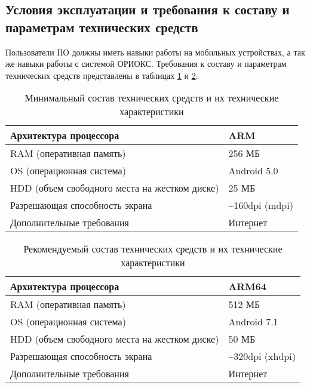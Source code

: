 \documentclass[draft,13sp]{mietuspd}
\begin{document}
\subsection{Условия эксплуатации и требования к составу и параметрам технических средств}
Пользователи ПО должны иметь навыки работы на мобильных устройствах, а так же навыки работы с системой ОРИОКС.
Требования к составу и параметрам технических средств представлены в таблицах \ref{table:rqmts_min} и \ref{table:rqmts_recommended}.

\begin{table}[h]
    \centering
    \begin{tabular}{|l|l|}
        \hline Архитектура процессора & ARM \\ \hline
        RAM (оперативная память) & 256 МБ \\ \hline
        OS (операционная система) & Android 5.0 \\ \hline
        HDD (объем свободного места на жестком диске) & 25 МБ \\ \hline
        Разрешающая способность экрана & \textasciitilde 160dpi (mdpi) \\ \hline
        Дополнительные требования & Интернет \\ \hline
    \end{tabular}
    \caption{Минимальный состав технических средств и их технические характеристики}
    \label{table:rqmts_min}
\end{table}

\begin{table}[h]
    \centering
    \begin{tabular}{|l|l|}
        \hline Архитектура процессора & ARM64 \\ \hline
        RAM (оперативная память) & 512 МБ \\ \hline
        OS (операционная система) & Android 7.1 \\ \hline
        HDD (объем свободного места на жестком диске) & 50 МБ \\ \hline
        Разрешающая способность экрана & \textasciitilde 320dpi (xhdpi) \\ \hline
        Дополнительные требования & Интернет \\ \hline
    \end{tabular}
    \caption{Рекомендуемый состав технических средств и их технические характеристики}
    \label{table:rqmts_recommended}
\end{table}
\end{document}
